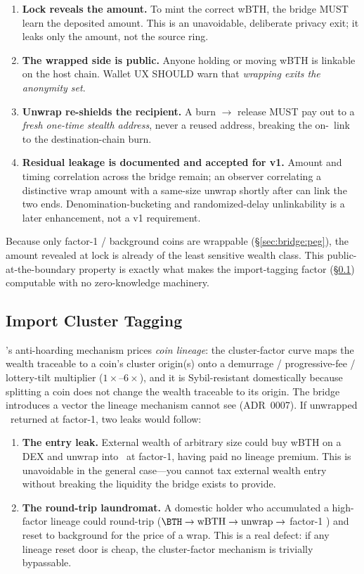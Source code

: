 \begin{enumerate}
  \item \textbf{Lock reveals the amount.} To mint the correct wBTH, the bridge
    MUST learn the deposited amount. This is an unavoidable, deliberate privacy
    exit; it leaks only the amount, not the source ring.
  \item \textbf{The wrapped side is public.} Anyone holding or moving wBTH is
    linkable on the host chain. Wallet UX SHOULD warn that \emph{wrapping exits
    the anonymity set}.
  \item \textbf{Unwrap re-shields the recipient.} A burn $\to$ release MUST pay
    out to a \emph{fresh one-time stealth address}, never a reused address,
    breaking the on-\Botho\ link to the destination-chain burn.
  \item \textbf{Residual leakage is documented and accepted for v1.} Amount and
    timing correlation across the bridge remain; an observer correlating a
    distinctive wrap amount with a same-size unwrap shortly after can link the
    two ends. Denomination-bucketing and randomized-delay unlinkability is a
    later enhancement, not a v1 requirement.
\end{enumerate}

Because only factor-1 / background coins are wrappable
(\S\ref{sec:bridge:peg}), the amount revealed at lock is already of the least
sensitive wealth class. This public-at-the-boundary property is exactly what
makes the import-tagging factor (\S\ref{sec:bridge:import}) computable with no
zero-knowledge machinery.

\subsection{Import Cluster Tagging}
\label{sec:bridge:import}

\Botho's anti-hoarding mechanism prices \emph{coin lineage}: the cluster-factor
curve maps the wealth traceable to a coin's cluster origin(s) onto a
demurrage / progressive-fee / lottery-tilt multiplier ($1\times$--$6\times$),
and it is Sybil-resistant domestically because splitting a coin does not change
the wealth traceable to its origin. The bridge introduces a vector the lineage
mechanism cannot see (ADR~0007). If unwrapped \BTH\ returned at factor-1, two
leaks would follow:

\begin{enumerate}
  \item \textbf{The entry leak.} External wealth of arbitrary size could buy
    wBTH on a DEX and unwrap into \Botho\ at factor-1, having paid no lineage
    premium. This is unavoidable in the general case---you cannot tax external
    wealth entry without breaking the liquidity the bridge exists to provide.
  \item \textbf{The round-trip laundromat.} A domestic holder who accumulated a
    high-factor lineage could round-trip
    ($\BTH \to \text{wBTH} \to \text{unwrap} \to$ factor-1 \BTH) and reset to
    background for the price of a wrap. This is a real defect: if any lineage
    reset door is cheap, the cluster-factor mechanism is trivially bypassable.
\end{enumerate}

